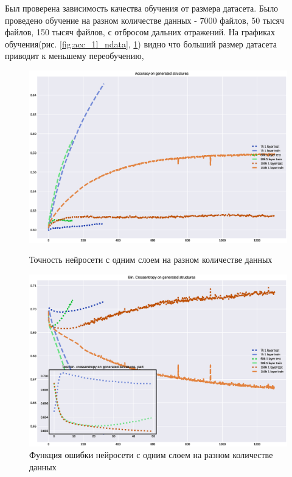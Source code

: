 \documentclass{article}
\begin{document}
Был проверена зависимость качества обучения от размера датасета. Было проведено обучение на разном количестве данных - 7000 файлов, 50 тысяч файлов, 150 тысяч файлов, с отбросом дальних отражений. На графиках обучения(рис. \ref{fig:acc_1l_ndata}, \ref{fig:loss_1l_ndata}) видно что больший размер датасета приводит к меньшему переобучению, %

\begin{figure}[!h]
\includegraphics[width=\linewidth]{imgs/acc-1l_ndata.eps}
  \caption{Точность нейросети с одним слоем на разном количестве данных}\label{fig:acc_1l_ndata}
\endminipage\hfill
{}%
\includegraphics[width=\linewidth]{imgs/loss-1l_ndata.eps}
  \caption{Функция ошибки нейросети с одним слоем на разном количестве данных}\label{fig:loss_1l_ndata}
\endminipage
\end{figure}
\end{document}
